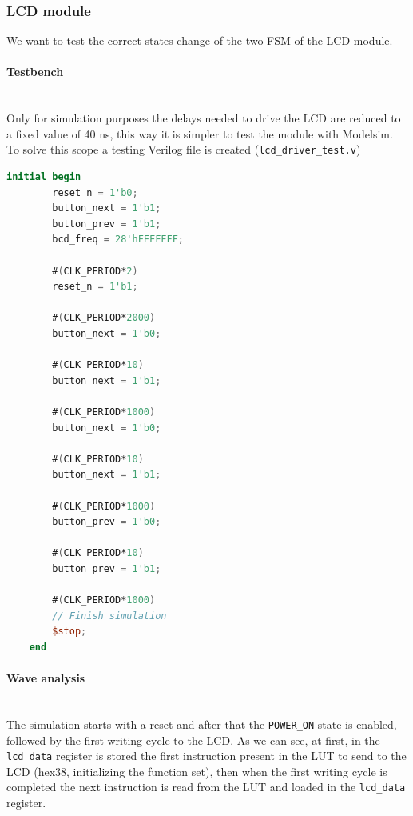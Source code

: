 \newpage

\subsubsection{LCD module}
We want to test the correct states change of the two FSM of the LCD module. 

\paragraph{Testbench} \quad \\
Only for simulation purposes the delays needed to drive the LCD are reduced to a fixed value of 40 ns, this way it is simpler to test the module with Modelsim. To solve this scope a testing Verilog file is created (\texttt{lcd\_driver\_test.v})

\vspace{0.5cm}
\begin{lstlisting}[language=Verilog, caption=LCD module testbench  ]
    initial begin
        reset_n = 1'b0;
        button_next = 1'b1;
        button_prev = 1'b1;
        bcd_freq = 28'hFFFFFFF;
        
        #(CLK_PERIOD*2)	  
        reset_n = 1'b1;
        
        #(CLK_PERIOD*2000)
        button_next = 1'b0;
        
        #(CLK_PERIOD*10)
        button_next = 1'b1;
        
        #(CLK_PERIOD*1000)
        button_next = 1'b0;
        
        #(CLK_PERIOD*10)
        button_next = 1'b1;
        
        #(CLK_PERIOD*1000)
        button_prev = 1'b0;
        
        #(CLK_PERIOD*10)
        button_prev = 1'b1;
            
        #(CLK_PERIOD*1000)
        // Finish simulation
        $stop;
    end
\end{lstlisting}
\vspace{1cm}

\newpage

\paragraph{Wave analysis} \quad \\
The simulation starts with a reset and after that the \texttt{POWER\_ON} state is enabled, followed by the first writing cycle to the LCD. As we can see, at first, in the \texttt{lcd\_data} register is stored the first instruction present in the LUT to send to the LCD (hex38, initializing the function set), then when the first writing cycle is completed the next instruction is read from the LUT and loaded in the \texttt{lcd\_data} register. 

